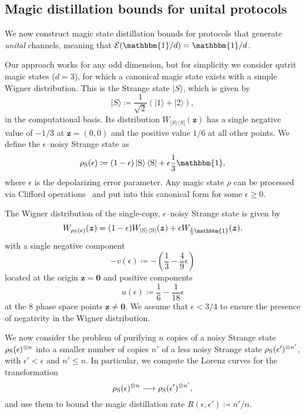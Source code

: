 \documentclass[
onecolumn,
superscriptaddress
]{revtex4-1}
\def\>{\rangle}
\def\<{\langle}
\def\id{\mathbbm{1}}
\def\bmo{\boldsymbol{0}}
\def\z{\boldsymbol{z}}
\def\E{{\cal E}}
\begin{document}
\subsection*{Magic distillation bounds for unital protocols}

We now construct magic state distillation bounds for protocols that generate \emph{unital} channels, meaning that $\E(\id/d) = \id/d$.

Our approach works for any odd dimension, but for simplicity we consider qutrit magic states ($d=3$), for which a canonical magic state exists with a simple Wigner distribution. This is the Strange state $|S\>$, which is given by
\begin{equation}
|S\> \coloneqq \frac{1}{\sqrt{2}} (|1\> + |2\>),
\end{equation}
in the computational basis. Its distribution $W_{|S\>\<S|}(\z)$ has a single negative value of $-1/3$ at $\z =(0,0)$ and the positive value $1/6$ at all other points. We define the $\epsilon$--noisy Strange state as
\begin{equation}\label{eq:noisysn}
    \rho_{\rm{S}}(\epsilon)\coloneqq (1 - \epsilon) \ket{\rm{S}}\bra{\rm{S}} + \epsilon \frac{1}{3}\id,
\end{equation}
where $\epsilon$ is the depolarizing error parameter. Any magic state $\rho$ can be processed via Clifford operations~\cite{cit:prakash,cit:prakash2} and put into this canonical form for some $\epsilon \ge 0$.

The Wigner distribution of the single-copy, $\epsilon$--noisy Strange state  is given by
\begin{equation}
	W_{\rho_{\rm{S}}(\epsilon)}(\z) = (1-\epsilon)W_{|\rm{S}\>\<\rm{S}|}(\z) + \epsilon W_{\frac{1}{3}\id}(\z).
\end{equation}
with a single negative component
\begin{equation}
	- v(\epsilon) \coloneqq - \left( \frac{1}{3} -\frac{4}{9}\epsilon \right)
\end{equation} 
located at the origin $\z = \bmo$ and positive components
\begin{equation}
	u(\epsilon) \coloneqq \frac{1}{6} -\frac{1}{18}\epsilon
\end{equation}
at the 8 phase space points $\z \ne \bmo$. We assume that $\epsilon < 3/4$ to ensure the presence of negativity in the Wigner distribution. 

We now consider the problem of purifying $n$ copies of a noisy Strange state $\rho_{\rm{S}}(\epsilon)^{\otimes n}$ into a smaller number of copies $n'$ of a less noisy Strange state $\rho_{\rm{S}}(\epsilon')^{\otimes n'}$, with $\epsilon' < \epsilon$ and $n' \leq n$. In particular, we compute the Lorenz curves for the transformation
\begin{equation}\label{eq:sudist}
	\rho_{\rm{S}}(\epsilon)^{\otimes n} \longrightarrow \rho_{\rm{S}}(\epsilon')^{\otimes n'},
\end{equation}
and use them to bound the magic distillation rate $R(\epsilon, \epsilon') \coloneqq n'/n$.
\end{document}

